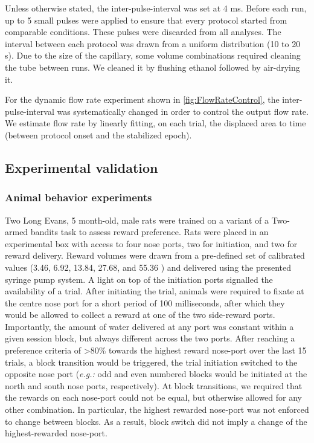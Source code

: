 Unless otherwise stated, the inter-pulse-interval was set at 4 ms. Before each run, up to 5 small pulses were applied to ensure that every protocol started from comparable conditions. These pulses were discarded from all analyses. The interval between each protocol was drawn from a uniform distribution (10 to 20 s). Due to the size of the capillary, some volume combinations required cleaning the tube between runs. We cleaned it by flushing ethanol followed by air-drying it.

For the dynamic flow rate experiment shown in \ref{fig:FlowRateControl}, the inter-pulse-interval was systematically changed in order to control the output flow rate. We estimate flow rate by linearly fitting, on each trial, the displaced area to time (between protocol onset and the stabilized epoch).

\subsection*{Experimental validation}

\subsubsection*{Animal behavior experiments}
Two Long Evans, 5 month-old, male rats were trained on a variant of a Two-armed bandits task  to assess reward preference. Rats were placed in an experimental box with access to four nose ports, two for initiation, and two for reward delivery. Reward volumes were drawn from a pre-defined set of calibrated values (3.46, 6.92, 13.84, 27.68, and 55.36 ) and delivered using the presented syringe pump system. A light on top of the initiation ports signalled the availability of a trial. After initiating the trial, animals were required to fixate at the centre nose port for a short period of 100 milliseconds, after which they would be allowed to collect a reward at one of the two side-reward ports. Importantly, the amount of water delivered at any port was constant within a given session block, but always different across the two ports. After reaching a preference criteria of >80\% towards the highest reward nose-port over the last 15 trials, a block transition would be triggered, the trial initiation switched to the opposite nose port (\textit{e.g.:} odd and even numbered blocks would be initiated at the north and south nose ports, respectively). At block transitions, we required that the rewards on each nose-port could not be equal, but otherwise allowed for any other combination. In particular, the highest rewarded nose-port was not enforced to change between blocks. As a result, block switch did not imply a change of the highest-rewarded nose-port.


